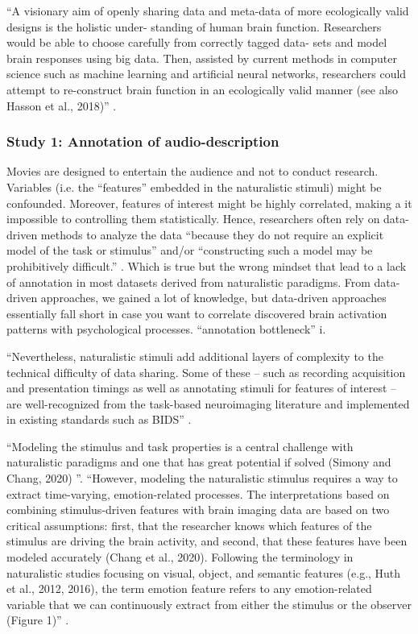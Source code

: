 %
``A visionary aim of openly sharing data and meta-data of more ecologically
valid designs is the holistic under- standing of human brain function.
Researchers would be able to choose carefully from correctly tagged data- sets
and model brain responses using big data. Then, assisted by current methods in
computer science such as machine learning and artiﬁcial neural networks,
researchers could attempt to re-construct brain function in an ecologically
valid manner (see also Hasson et al., 2018)'' \citep{kandylaki2019story}.


\subsubsection{Study 1: Annotation of audio-description}



%
Movies are designed to entertain the audience and not to conduct research.
%
Variables (i.e. the ``features'' embedded in the naturalistic stimuli) might be
confounded.
%
Moreover, features of interest might be highly correlated, making a it
impossible to controlling them statistically.
%
Hence, researchers often rely on data-driven methods to analyze the data
``because they do not require an explicit model of the task or stimulus'' and/or
``constructing such a model may be prohibitively difficult.''
\citep{nastase2019measuring}.
%
Which is true but the wrong mindset that lead to a lack of annotation in most
datasets derived from naturalistic paradigms.
%
From data-driven approaches, we gained a lot of knowledge, but data-driven
approaches essentially fall short in case you want to correlate discovered brain
activation patterns with psychological processes.
%
``annotation bottleneck'' \citep{aliko2020naturalistic}i.

``Nevertheless, naturalistic stimuli add additional layers of complexity to the
technical difﬁculty of data sharing. Some of these – such as recording
acquisition and presentation timings as well as annotating stimuli for features
of interest – are well-recognized from the task-based neuroimaging literature
and implemented in existing standards such as BIDS'' \citep{dupre2020nature}.


``Modeling the stimulus and task properties is a central challenge with
naturalistic paradigms and one that has great potential if solved (Simony and
Chang, 2020) \citep{saarimaki2021naturalistic}''.
%
``However, modeling the naturalistic stimulus requires a way to extract
time-varying, emotion-related processes. The interpretations based on combining
stimulus-driven features with brain imaging data are based on two critical
assumptions: first, that the researcher knows which features of the stimulus are
driving the brain activity, and second, that these features have been modeled
accurately (Chang et al., 2020). Following the terminology in naturalistic
studies focusing on visual, object, and semantic features (e.g., Huth et al.,
2012, 2016), the term emotion feature refers to any emotion-related variable
that we can continuously extract from either the stimulus or the observer
(Figure 1)'' \citep{saarimaki2021naturalistic}.


